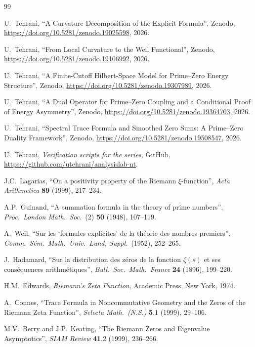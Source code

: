 \documentclass[11pt]{article}
\begin{document}
\newpage
\begin{thebibliography}{99}

U.~Tehrani,
``A Curvature Decomposition of the Explicit Formula'',
Zenodo, \url{https://doi.org/10.5281/zenodo.19025598}, 2026.

U.~Tehrani,
``From Local Curvature to the Weil Functional'',
Zenodo, \url{https://doi.org/10.5281/zenodo.19106992}, 2026.

U.~Tehrani,
``A Finite-Cutoff Hilbert-Space Model
for Prime--Zero Energy Structure'',
Zenodo, \url{https://doi.org/10.5281/zenodo.19307989}, 2026.

U.~Tehrani,
``A Dual Operator for Prime--Zero Coupling
and a Conditional Proof of Energy Asymmetry'',
Zenodo, \url{https://doi.org/10.5281/zenodo.19364703}, 2026.

U.~Tehrani,
``Spectral Trace Formula and Smoothed Zero Sums:
A Prime--Zero Duality Framework'',
Zenodo, \url{https://doi.org/10.5281/zenodo.19508547}, 2026.

U.~Tehrani,
\emph{Verification scripts for the series},
GitHub, \url{https://github.com/utehrani/analysislab-nt}.

J.C.~Lagarias,
``On a positivity property of the Riemann $\xi$-function'',
\emph{Acta Arithmetica} \textbf{89} (1999), 217--234.

A.P.~Guinand,
``A summation formula in the theory of prime numbers'',
\emph{Proc.\ London Math.\ Soc.}\ (2) \textbf{50} (1948), 107--119.

A.~Weil,
``Sur les `formules explicites' de la th\'eorie des nombres
premiers'',
\emph{Comm.\ S\'em.\ Math.\ Univ.\ Lund, Suppl.}\ (1952), 252--265.

J.~Hadamard,
``Sur la distribution des z\'eros de la fonction $\zeta(s)$
et ses cons\'equences arithm\'etiques'',
\emph{Bull.\ Soc.\ Math.\ France} \textbf{24} (1896), 199--220.

H.M.~Edwards,
\emph{Riemann's Zeta Function},
Academic Press, New York, 1974.

A.~Connes,
``Trace Formula in Noncommutative Geometry and the Zeros of the
Riemann Zeta Function'',
\emph{Selecta Math.\ (N.S.)} \textbf{5}.1 (1999), 29--106.

M.V.~Berry and J.P.~Keating,
``The Riemann Zeros and Eigenvalue Asymptotics'',
\emph{SIAM Review} \textbf{41}.2 (1999), 236--266.


\end{thebibliography}
\end{document}
